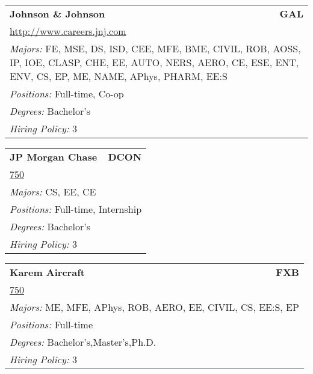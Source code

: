 \documentclass[twoside]{article}
\begin{document}
\begin{center}
\begin{multicols}{3}
\begin{FlushLeft}
\begin{minipage}{\columnwidth}\begin{tabularx}{.95\columnwidth}{Xr}
                 {\Large\bf Johnson \& Johnson} & {\Large\bf GAL}\\
    \multicolumn{2}{p{.95\columnwidth}}{\url{http://www.careers.jnj.com}}\\
    \multicolumn{2}{p{.95\columnwidth}}{\emph{Majors:} FE, MSE, DS, ISD, CEE, MFE, BME, CIVIL, ROB, AOSS, IP, IOE, CLASP, CHE, EE, AUTO, NERS, AERO, CE, ESE, ENT, ENV, CS, EP, ME, NAME, APhys, PHARM, EE:S}\\
    \multicolumn{2}{p{.95\columnwidth}}{\emph{Positions:} Full-time, Co-op}\\
    \multicolumn{2}{p{.95\columnwidth}}{\emph{Degrees:} Bachelor's}\\
    \multicolumn{2}{p{.95\columnwidth}}{\emph{Hiring Policy:} 3}\\
    \end{tabularx}
    
\end{minipage}
 
\begin{minipage}{\columnwidth}\begin{tabularx}{.95\columnwidth}{Xr}
                 {\Large\bf JP Morgan Chase} & {\Large\bf DCON}\\
    \multicolumn{2}{p{.95\columnwidth}}{\url{750}}\\
    \multicolumn{2}{p{.95\columnwidth}}{\emph{Majors:} CS, EE, CE}\\
    \multicolumn{2}{p{.95\columnwidth}}{\emph{Positions:} Full-time, Internship}\\
    \multicolumn{2}{p{.95\columnwidth}}{\emph{Degrees:} Bachelor's}\\
    \multicolumn{2}{p{.95\columnwidth}}{\emph{Hiring Policy:} 3}\\
    \end{tabularx}
    
\end{minipage}
 
\begin{minipage}{\columnwidth}\begin{tabularx}{.95\columnwidth}{Xr}
                 {\Large\bf Karem Aircraft} & {\Large\bf FXB}\\
    \multicolumn{2}{p{.95\columnwidth}}{\url{750}}\\
    \multicolumn{2}{p{.95\columnwidth}}{\emph{Majors:} ME, MFE, APhys, ROB, AERO, EE, CIVIL, CS, EE:S, EP}\\
    \multicolumn{2}{p{.95\columnwidth}}{\emph{Positions:} Full-time}\\
    \multicolumn{2}{p{.95\columnwidth}}{\emph{Degrees:} Bachelor's,Master's,Ph.D.}\\
    \multicolumn{2}{p{.95\columnwidth}}{\emph{Hiring Policy:} 3}\\
    \end{tabularx}
    

\end{minipage}
\end{FlushLeft}
\end{multicols}
\end{center}
\end{document}
